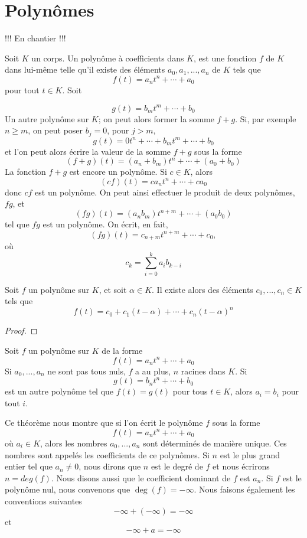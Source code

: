 \chapter{Polynômes}
\begin{tcolorbox}[colback = red!40, colframe = red]
   \centering!!! En chantier !!!
\end{tcolorbox}
Soit $K$ un corps. Un polynôme à coefficients dans $K$, est une fonction $f$ de $K$ dans lui-même telle qu'il existe des éléments $a_0,a_1,...,a_n$ de $K$ tels que
\[
f(t)=a_nt^n+\cdots +a_0
\]
pour tout $t\in K$. Soit

\[
g(t)=b_mt^m+\cdots+b_0
\]
Un autre polynôme sur $K$; on peut alors former la somme $f+g$. Si, par exemple $n\geq m$, on peut poser $b_j=0$, pour $j>m,$
\[
g(t)=0t^n+\cdots +b_mt^m+\cdots +b_0
\]
et l'on peut alors écrire la valeur de la somme $f+g$ sous la forme
\[
(f+g)(t)=(a_n+b_m)t^n+\cdots+(a_0+b_0)
\]
La fonction $f+g$ est encore un polynôme. Si $c\in K$, alors
\[
(cf)(t)=ca_nt^n+\cdots+ca_0
\]
donc $cf$ est un polynôme.
On peut ainsi effectuer le produit de deux polynômes, $fg$, et
\[
(fg)(t)= (a_nb_m)t^{n+m}+\cdots+(a_0b_0)
\]
tel que $fg$ est un polynôme. On écrit, en fait,
\[
(fg)(t)=c_{n+m}t^{n+m}+\cdots+c_0,
\]
où
\[
c_k=\sum_{i=0}^ka_ib_{k-i}
\]

    \begin{lemme}
        Soit $f$ un polynôme sur $K$, et soit $\alpha \in K$. Il existe alors des éléments $c_0,...,c_n\in K$ tels que
        \[
        f(t)=c_0+c_1(t-\alpha)+\cdots+c_n(t-\alpha)^n
        \]
    \end{lemme}
\begin{proof}
    
\end{proof}

    \begin{theoreme}
        Soit $f$ un polynôme sur $K$ de la forme
        \[
        f(t)=a_nt^n+\cdots+a_0
        \]
        Si $a_0,...,a_n$ ne sont pas tous nuls, $f$ a au plus, $n$ racines dans $K$. Si 
        \[
        g(t)=b_nt^n+\cdots+b_0
        \]
        est un autre polynôme tel que $f(t)=g(t)$ pour tous $t\in K$, alors $a_i=b_i$ pour tout $i$.
    \end{theoreme}

Ce théorème nous montre que si l'on écrit le polynôme $f$ sous la forme
\[
f(t)=a_nt^n+\cdots+a_0
\]
où $a_i\in K$, alors les nombres $a_0,...,a_n$ sont déterminés de manière unique. Ces nombres sont appelés les coefficients de ce polynômes. Si $n$ est le plus grand entier tel que $a_n\neq0$, nous dirons que $n$ est le degré de $f$ et nous écrirons $n=deg(f)$. Nous disons aussi que le coefficient dominant de $f$ est $a_n$. Si $f$ est le polynôme nul, nous convenons que $\operatorname{deg}(f)=-\infty$.
Nous faisons également les conventions suivantes
\[
-\infty+(-\infty)=-\infty
\]
et
\[
-\infty+a=-\infty
\]


